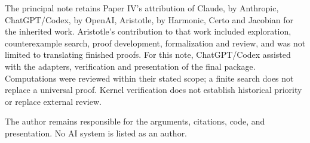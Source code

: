 \documentclass[english,11pt,a4paper]{article}
\begin{document}
The principal note retains Paper IV's attribution of Claude, by
Anthropic, ChatGPT/Codex, by OpenAI, Aristotle, by Harmonic, Certo and
Jacobian for the inherited work. Aristotle's contribution to that work
included exploration, counterexample search, proof development,
formalization and review, and was not limited to translating finished
proofs. For this note, ChatGPT/Codex assisted with the adapters,
verification and presentation of the final package. Computations were
reviewed within their stated scope; a finite search does not replace a
universal proof. Kernel verification does not establish historical
priority or replace external review.

The author remains responsible for the arguments, citations, code, and
presentation. No AI system is listed as an author.
\end{document}
